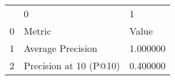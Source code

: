 \begin{tabular}{lll}
 & 0 & 1 \\
0 & Metric & Value \\
1 & Average Precision & 1.000000 \\
2 & Precision at 10 (P@10) & 0.400000 \\
\end{tabular}
